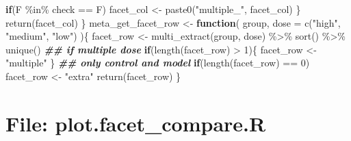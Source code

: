 \documentclass[
]{article}
\newenvironment{Shaded}{\begin{snugshade}}{\end{snugshade}}
\newcommand{\AttributeTok}[1]{\textcolor[rgb]{0.77,0.63,0.00}{#1}}
\newcommand{\ControlFlowTok}[1]{\textcolor[rgb]{0.13,0.29,0.53}{\textbf{#1}}}
\newcommand{\DecValTok}[1]{\textcolor[rgb]{0.00,0.00,0.81}{#1}}
\newcommand{\DocumentationTok}[1]{\textcolor[rgb]{0.56,0.35,0.01}{\textbf{\textit{#1}}}}
\newcommand{\FunctionTok}[1]{\textcolor[rgb]{0.00,0.00,0.00}{#1}}
\newcommand{\NormalTok}[1]{#1}
\newcommand{\OtherTok}[1]{\textcolor[rgb]{0.56,0.35,0.01}{#1}}
\newcommand{\SpecialCharTok}[1]{\textcolor[rgb]{0.00,0.00,0.00}{#1}}
\newcommand{\StringTok}[1]{\textcolor[rgb]{0.31,0.60,0.02}{#1}}
\begin{document}
\begin{Shaded}
\begin{Highlighting}[]
      \ControlFlowTok{if}\NormalTok{(F }\SpecialCharTok{\%in\%}\NormalTok{ check }\SpecialCharTok{==}\NormalTok{ F)}
\NormalTok{        facet\_col }\OtherTok{\textless{}{-}} \FunctionTok{paste0}\NormalTok{(}\StringTok{"multiple\_"}\NormalTok{, facet\_col)}
\NormalTok{    \}}
    \FunctionTok{return}\NormalTok{(facet\_col)}
\NormalTok{  \}}
\NormalTok{meta\_get\_facet\_row }\OtherTok{\textless{}{-}} 
  \ControlFlowTok{function}\NormalTok{(}
\NormalTok{           group,}
           \AttributeTok{dose =} \FunctionTok{c}\NormalTok{(}\StringTok{"high"}\NormalTok{, }\StringTok{"medium"}\NormalTok{, }\StringTok{"low"}\NormalTok{)}
\NormalTok{           )\{}
\NormalTok{    facet\_row }\OtherTok{\textless{}{-}} \FunctionTok{multi\_extract}\NormalTok{(group, dose) }\SpecialCharTok{\%\textgreater{}\%}
      \FunctionTok{sort}\NormalTok{() }\SpecialCharTok{\%\textgreater{}\%}
      \FunctionTok{unique}\NormalTok{()}
    \DocumentationTok{\#\# if multiple dose}
    \ControlFlowTok{if}\NormalTok{(}\FunctionTok{length}\NormalTok{(facet\_row) }\SpecialCharTok{\textgreater{}} \DecValTok{1}\NormalTok{)\{}
\NormalTok{      facet\_row }\OtherTok{\textless{}{-}} \StringTok{"multiple"}
\NormalTok{    \}}
    \DocumentationTok{\#\# only control and model}
    \ControlFlowTok{if}\NormalTok{(}\FunctionTok{length}\NormalTok{(facet\_row) }\SpecialCharTok{==} \DecValTok{0}\NormalTok{)}
\NormalTok{      facet\_row }\OtherTok{\textless{}{-}} \StringTok{"extra"}
    \FunctionTok{return}\NormalTok{(facet\_row)}
\NormalTok{  \}}
\end{Highlighting}
\end{Shaded}

\hypertarget{file-plot.facet_compare.r}{%
\section{File: plot.facet\_compare.R}\label{file-plot.facet_compare.r}}
\end{document}
